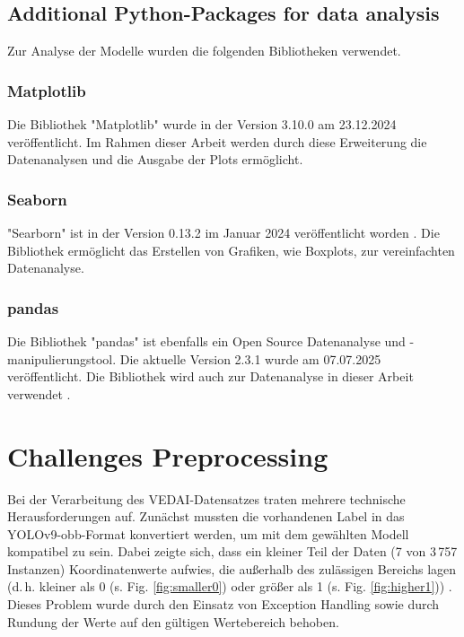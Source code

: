 \subsection{Additional Python-Packages for data analysis}
Zur Analyse der Modelle wurden die folgenden Bibliotheken verwendet.
\subsubsection*{Matplotlib}
Die Bibliothek "Matplotlib" wurde in der Version 3.10.0 am 23.12.2024 veröffentlicht\cite{matplotlib}. Im Rahmen dieser Arbeit werden durch diese Erweiterung die Datenanalysen und die Ausgabe der Plots ermöglicht.
\subsubsection*{Seaborn}
"Searborn" ist in der Version 0.13.2 im Januar 2024 veröffentlicht worden \cite{seaborn}. Die Bibliothek ermöglicht das Erstellen von Grafiken, wie Boxplots, zur vereinfachten Datenanalyse.
\subsubsection*{pandas}
Die Bibliothek "pandas" ist ebenfalls ein Open Source Datenanalyse und -manipulierungstool. Die aktuelle Version 2.3.1 wurde am 07.07.2025 veröffentlicht. Die Bibliothek wird auch zur Datenanalyse in dieser Arbeit verwendet \cite{pandas}.




\section{Challenges Preprocessing}
Bei der Verarbeitung des VEDAI-Datensatzes traten mehrere technische Herausforderungen auf. 
Zunächst mussten die vorhandenen Label in das \acrshort{YOLO}v9-\acrshort{obb}-Format konvertiert werden, um mit dem gewählten Modell kompatibel zu sein. 
Dabei zeigte sich, dass ein kleiner Teil der Daten (7 von 3\,757 Instanzen) Koordinatenwerte aufwies, die außerhalb des zulässigen Bereichs lagen (d.\,h. kleiner als 0 (s. Fig. \ref{fig:smaller0}) oder größer als 1 (s. Fig. \ref{fig:higher1})) . 
Dieses Problem wurde durch den Einsatz von Exception Handling sowie durch Rundung der Werte auf den gültigen Wertebereich behoben. 

